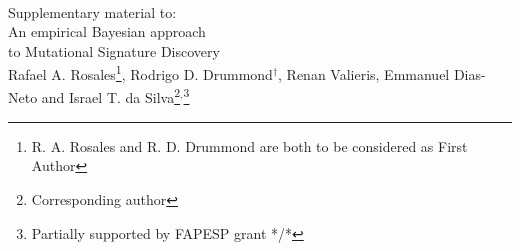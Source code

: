 \documentclass[11pt]{amsart}
\theoremstyle{definition}
\theoremstyle{remark}
\begin{document}
\title[\textup{R. A. Rosales, R. D. Drummond, 
       R. Valieris, E. Dias-Neto, I. T. da Silva}]{} 
\\[1em]
 \begin{center}
   {\large Supplementary material to:}\\[1em]
   {\Large\sc An empirical Bayesian approach}\\[0.3em] 
   {\Large\sc to Mutational Signature Discovery}\\[2em]
   {\large 
     Rafael A. Rosales\footnote{R. A. Rosales and R. D. Drummond are
       both to be considered as First Author}, 
     Rodrigo D. Drummond$^\dagger$,
     Renan Valieris, Emmanuel Dias-Neto  and
     Israel T. da Silva\footnote{Corresponding
       author}$^,$\footnote{Partially supported by FAPESP grant */*}}
 \end{center}


\maketitle

\end{document}
